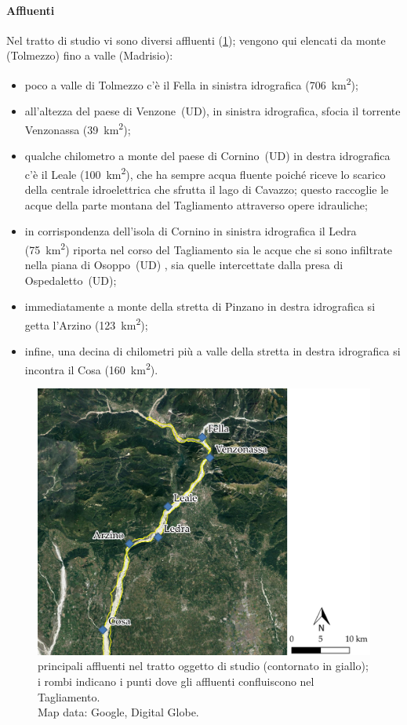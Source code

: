 \paragraph{Affluenti}
Nel tratto di studio vi sono diversi affluenti (\cref{fig:affluenti}); vengono qui elencati da monte (Tolmezzo) fino a valle (Madrisio):
%
\begin{itemize}
	\item poco a valle di Tolmezzo c'è il Fella in sinistra idrografica (\SI{706}{\kilo\m\tothe{2}});
	\item all'altezza del paese di Venzone~(UD), in sinistra idrografica, sfocia il torrente Venzonassa (\SI{39}{\kilo\m\tothe{2}});
	\item qualche chilometro a monte del paese di Cornino~(UD) in destra idrografica c'è il Leale (\SI{100}{\kilo\m\tothe{2}}), che ha sempre acqua fluente poiché riceve lo scarico della centrale idroelettrica che sfrutta il lago di Cavazzo; questo raccoglie le acque della parte montana del Tagliamento attraverso opere idrauliche;
	\item in corrispondenza dell'isola di Cornino in sinistra idrografica il Ledra (\SI{75}{\kilo\m\tothe{2}}) riporta nel corso del Tagliamento sia le acque che si sono infiltrate nella piana di Osoppo~(UD) , sia quelle intercettate dalla presa di Ospedaletto~(UD);
	\item immediatamente a monte della stretta di Pinzano in destra idrografica si getta l'Arzino (\SI{123}{\kilo\m\tothe{2}});
	\item infine, una decina di chilometri più a valle della stretta in destra idrografica si incontra il Cosa (\SI{160}{\kilo\m\tothe{2}}).
\end{itemize}
%
\begin{figure}
	\centering
	\includegraphics[width=\textwidth]{files/overview_affluenti.jpeg}
	\caption[principali affluenti nel tratto oggetto di studio]{principali affluenti nel tratto oggetto di studio (contornato in giallo); i rombi indicano i punti dove gli affluenti confluiscono nel Tagliamento.
	\\
	Map data: Google, Digital Globe.}
	\label{fig:affluenti}
\end{figure}
